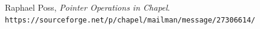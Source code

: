 \documentclass{article}
\begin{document}
\begin{thebibliography}{9}

  Raphael Poss,
  \emph{Pointer Operations in Chapel}.\\
  \texttt{https://sourceforge.net/p/chapel/mailman/message/27306614/}

\end{thebibliography}


\end{document}
